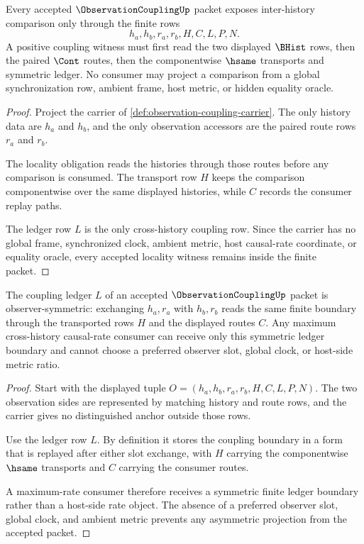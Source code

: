 \begin{theorem}
\label{thm:observation-coupling-locality-obligations}
Every accepted $\ObservationCouplingUp$ packet exposes inter-history comparison only through the finite rows
$$
h_a,h_b,r_a,r_b,H,C,L,P,N.
$$
A positive coupling witness must first read the two displayed $\BHist$ rows, then the paired $\Cont$ routes, then the componentwise $\hsame$ transports and symmetric ledger. No consumer may project a comparison from a global synchronization row, ambient frame, host metric, or hidden equality oracle.
\end{theorem}
\begin{proof}
Project the carrier of \autoref{def:observation-coupling-carrier}. The only history data are $h_a$ and $h_b$, and the only observation accessors are the paired route rows $r_a$ and $r_b$.

The locality obligation reads the histories through those routes before any comparison is consumed. The transport row $H$ keeps the comparison componentwise over the same displayed histories, while $C$ records the consumer replay paths.

The ledger row $L$ is the only cross-history coupling row. Since the carrier has no global frame, synchronized clock, ambient metric, host causal-rate coordinate, or equality oracle, every accepted locality witness remains inside the finite packet.
\end{proof}

\begin{theorem}
\label{thm:observation-coupling-symmetric-rate-boundary}
The coupling ledger $L$ of an accepted $\ObservationCouplingUp$ packet is observer-symmetric: exchanging $h_a,r_a$ with $h_b,r_b$ reads the same finite boundary through the transported rows $H$ and the displayed routes $C$. Any maximum cross-history causal-rate consumer can receive only this symmetric ledger boundary and cannot choose a preferred observer slot, global clock, or host-side metric ratio.
\end{theorem}
\begin{proof}
Start with the displayed tuple $O=(h_a,h_b,r_a,r_b,H,C,L,P,N)$. The two observation sides are represented by matching history and route rows, and the carrier gives no distinguished anchor outside those rows.

Use the ledger row $L$. By definition it stores the coupling boundary in a form that is replayed after either slot exchange, with $H$ carrying the componentwise $\hsame$ transports and $C$ carrying the consumer routes.

A maximum-rate consumer therefore receives a symmetric finite ledger boundary rather than a host-side rate object. The absence of a preferred observer slot, global clock, and ambient metric prevents any asymmetric projection from the accepted packet.
\end{proof}


